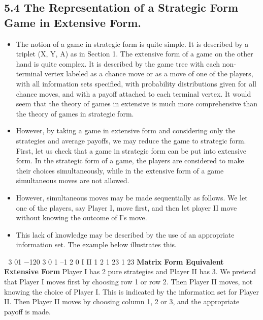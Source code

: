 \begin{framed}
\subsection{5.4 The Representation of a Strategic Form Game in Extensive Form.}
\begin{itemize} 
\item The
notion of a game in strategic form is quite simple. It is described by a triplet (X, Y, A) as in
Section 1. The extensive form of a game on the other hand is quite complex. It is described
by the game tree with each non-terminal vertex labeled as a chance move or as a move
of one of the players, with all information sets specified, with probability distributions
given for all chance moves, and with a payoff attached to each terminal vertex. 
\itme It would
seem that the theory of games in extensive is much more comprehensive than the theory
of games in strategic form. 
\item However, by taking a game in extensive form and considering
only the strategies and average payoffs, we may reduce the game to strategic form.
First, let us check that a game in strategic form can be put into extensive form. In the
strategic form of a game, the players are considered to make their choices simultaneously,
while in the extensive form of a game simultaneous moves are not allowed.
\item  However,
simultaneous moves may be made sequentially as follows. We let one of the players, say
Player I, move first, and then let player II move without knowing the outcome of I’s move.
\item This lack of knowledge may be described by the use of an appropriate information set.
The example below illustrates this.
\end{itemize}
 3 01
−120
3 0 1 –1 2 0
I
II
1 2
1 23 1 23
\noindent \textbf{Matrix Form Equivalent Extensive Form}
Player I has 2 pure strategies and Player II has 3. We pretend that Player I moves first by
choosing row 1 or row 2. Then Player II moves, not knowing the choice of Player I. This is
indicated by the information set for Player II. Then Player II moves by choosing column
1, 2 or 3, and the appropriate payoff is made.

\end{framed}
